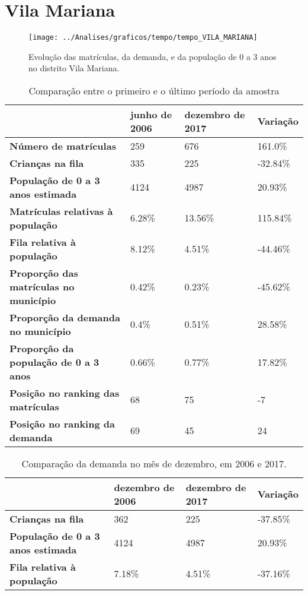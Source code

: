 \section{Vila Mariana}
\begin{figure}[H]
\centering
\texttt{[image: ../Analises/graficos/tempo/tempo\_VILA\_MARIANA]}
\caption{Evolução das matrículas, da demanda, e da população de 0 a 3 anos no distrito Vila Mariana.}
\end{figure}
\begin{table}[H]
\begin{tabular}{|l|l|l|l|}
\hline
\textbf{}                                      & \textbf{junho de 2006}       & \textbf{dezembro de 2017}    & \textbf{Variação} \\ \hline
\textbf{Número de matrículas}                  & 259 & 676 & 161.0\% \\ \hline
\textbf{Crianças na fila}                      & 335 & 225 & -32.84\% \\ \hline
\textbf{População de 0 a 3 anos estimada}      & 4124 & 4987 & 20.93\% \\ \hline
\textbf{Matrículas relativas à população}      & 6.28\% & 13.56\% & 115.84\% \\ \hline
\textbf{Fila relativa à população}             & 8.12\% & 4.51\% & -44.46\% \\ \hline
\textbf{Proporção das matrículas no município} & 0.42\% & 0.23\% & -45.62\% \\ \hline
\textbf{Proporção da demanda no município}     & 0.4\% & 0.51\% & 28.58\% \\ \hline
\textbf{Proporção da população de 0 a 3 anos}  & 0.66\% & 0.77\% & 17.82\% \\ \hline
\textbf{Posição no ranking das matrículas}     & 68 & 75 & -7 \\ \hline
\textbf{Posição no ranking da demanda}         & 69 & 45 & 24 \\ \hline
\end{tabular}
\caption{Comparação entre o primeiro e o último período da amostra}
\end{table}
\begin{table}[H]
\begin{tabular}{|l|l|l|l|}
\hline
\textbf{}                                 & \textbf{dezembro de 2006} & \textbf{dezembro de 2017} & \textbf{Variação} \\ \hline
\textbf{Crianças na fila}                      & 362 & 225 & -37.85\% \\ \hline
\textbf{População de 0 a 3 anos estimada}      & 4124 & 4987 & 20.93\% \\ \hline
\textbf{Fila relativa à população}             & 7.18\% & 4.51\% & -37.16\% \\ \hline
\end{tabular}
\caption{Comparação da demanda no mês de dezembro, em 2006 e 2017.}
\end{table}
